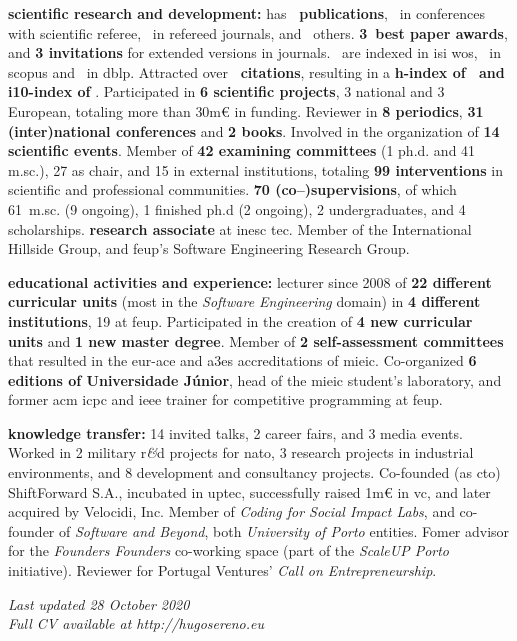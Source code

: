 \documentclass[11pt, a4paper, pstricks]{article}
\newcommand{\amper}{{\fontspec[Scale=.95]{Hoefler Text}\selectfont\itshape\&}}
\begin{document}
\vspace{5mm}\textbf{scientific research and development:} has \textbf{\totalpublications~publications}, \totalconferences~in conferences with scientific referee, \totaljournals~in refereed journals, and \totalothers~others. \textbf{3~best paper awards}, and \textbf{3 invitations} for extended versions in journals. \totalwos~are indexed in {\sc isi wos}, \totalscopus~in {\sc scopus} and \totaldblp~in {\sc dblp}. Attracted over \textbf{\citations~citations}, resulting in a \textbf{h-index of \hindex~and i10-index of \iindex}. Participated in \textbf{6 scientific projects}, 3 national and 3 European, totaling more than {\sc 30m€} in funding. Reviewer in \textbf{8 periodics}, \textbf{31 (inter)national conferences} and \textbf{2 books}. Involved in the organization of \textbf{14 scientific events}. Member of \textbf{42 examining committees} (1 {\sc ph.d.} and 41 {\sc m.sc.}), 27 as chair, and 15 in external institutions, totaling \textbf{99 interventions} in scientific and professional communities. \textbf{70 (co--)supervisions}, of which 61~{\sc m.sc.} (9 ongoing), 1 finished {\sc ph.d} (2 ongoing), 2 undergraduates, and 4 scholarships. \textbf{research associate} at {\sc inesc tec}. Member of the International Hillside Group, and {\sc feup}'s Software Engineering Research Group.

\vspace{5mm}\textbf{educational activities and experience:} lecturer since 2008 of \textbf{22 different curricular units} (most in the \emph{Software Engineering} domain) in \textbf{4 different institutions}, 19 at {\sc feup}. Participated in the creation of \textbf{4 new curricular units} and \textbf{1 new master degree}. Member of \textbf{2 self-assessment committees} that resulted in the {\sc eur-ace} and {\sc a3es} accreditations of {\sc mieic}. Co-organized \textbf{6 editions of Universidade Júnior}, head of the {\sc mieic} student's laboratory, and former {\sc acm icpc} and {\sc ieee} trainer for competitive programming at {\sc feup}.

\vspace{2mm}\textbf{knowledge transfer:} 14 invited talks, 2 career fairs, and 3 media events. Worked in 2 military {\sc r\amper d} projects for {\sc nato}, 3 research projects in industrial environments, and 8 development and consultancy projects. Co-founded (as {\sc cto}) ShiftForward S.A., incubated in {\sc uptec}, successfully raised {\sc 1m€} in {\sc vc}, and later acquired by Velocidi, Inc. Member of \emph{Coding for Social Impact Labs}, and co-founder of \emph{Software and Beyond}, both \emph{University of Porto} entities. Fomer advisor for the \emph{Founders Founders} co-working space (part of the \emph{ScaleUP Porto} initiative). Reviewer for Portugal Ventures’ \emph{Call on Entrepreneurship}.

\begin{center}
  \vspace{10mm}
  \emph{\small{Last updated 28 October 2020\\ Full CV available at http://hugosereno.eu}}
\end{center}
\end{document}
